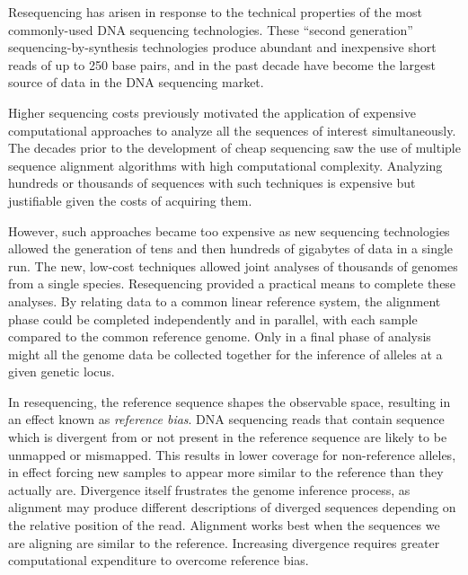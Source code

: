 Resequencing has arisen in response to the technical properties of the most commonly-used DNA sequencing technologies.
These ``second generation'' sequencing-by-synthesis technologies produce abundant and inexpensive short reads of up to 250 base pairs, and in the past decade have become the largest source of data in the DNA sequencing market.

Higher sequencing costs previously motivated the application of expensive computational approaches to analyze all the sequences of interest simultaneously.
The decades prior to the development of cheap sequencing saw the use of multiple sequence alignment algorithms with high computational complexity.
Analyzing hundreds or thousands of sequences with such techniques is expensive but justifiable given the costs of acquiring them.

However, such approaches became too expensive as new sequencing technologies allowed the generation of tens and then hundreds of gigabytes of data in a single run.
The new, low-cost techniques allowed joint analyses of thousands of genomes from a single species.
Resequencing provided a practical means to complete these analyses.
By relating data to a common linear reference system, the alignment phase could be completed independently and in parallel, with each sample compared to the common reference genome.
Only in a final phase of analysis might all the genome data be collected together for the inference of alleles at a given genetic locus.

In resequencing, the reference sequence shapes the observable space, resulting in an effect known as \emph{reference bias}.
DNA sequencing reads that contain sequence which is divergent from or not present in the reference sequence are likely to be unmapped or mismapped.
This results in lower coverage for non-reference alleles, in effect forcing new samples to appear more similar to the reference than they actually are.
Divergence itself frustrates the genome inference process, as alignment may produce different descriptions of diverged sequences depending on the relative position of the read.
Alignment works best when the sequences we are aligning are similar to the reference.
Increasing divergence requires greater computational expenditure to overcome reference bias.

